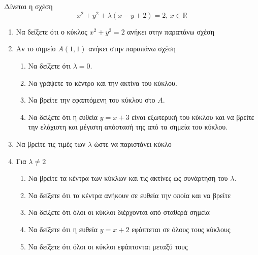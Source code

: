 \documentclass[12pt]{article}
\begin{document}
\part*{}

Δίνεται η σχέση
$$x^2+y^2+λ(x-y+2)=2 \text{, } x\in \mathbb{R}$$
\begin{enumerate}
 \item Να δείξετε ότι ο κύκλος $x^2+y^2=2$ ανήκει στην παραπάνω σχέση
 \item Αν το σημείο $A(1,1)$ ανήκει στην παραπάνω σχέση
   \begin{enumerate}
    \item Να δείξετε ότι $λ=0$.
    \item Να γράψετε το κέντρο και την ακτίνα του κύκλου.
    \item Να βρείτε την εφαπτόμενη του κύκλου στο $A$.
    \item Να δείξετε ότι η ευθεία $y=x+3$ είναι εξωτερική του κύκλου και να βρείτε την ελάχιστη και μέγιστη απόστασή της από τα σημεία του κύκλου.
   \end{enumerate}
 \item Να βρείτε τις τιμές των $λ$ ώστε να παριστάνει κύκλο
 \item Για $λ\ne 2$
   \begin{enumerate}
      \item Να βρείτε τα κέντρα των κύκλων και τις ακτίνες ως συνάρτηση του $λ$.
      \item Να δείξετε ότι τα κέντρα ανήκουν σε ευθεία την οποία και να βρείτε
      \item Να δείξετε ότι όλοι οι κύκλοι διέρχονται από σταθερά σημεία
      \item Να δείξετε ότι η ευθεία $y=x+2$ εφάπτεται σε όλους τους κύκλους
      \item Να δείξετε ότι όλοι οι κύκλοι εφάπτονται μεταξύ τους
   \end{enumerate}
\end{enumerate}

\pagebreak

\part*{}
\end{document}
